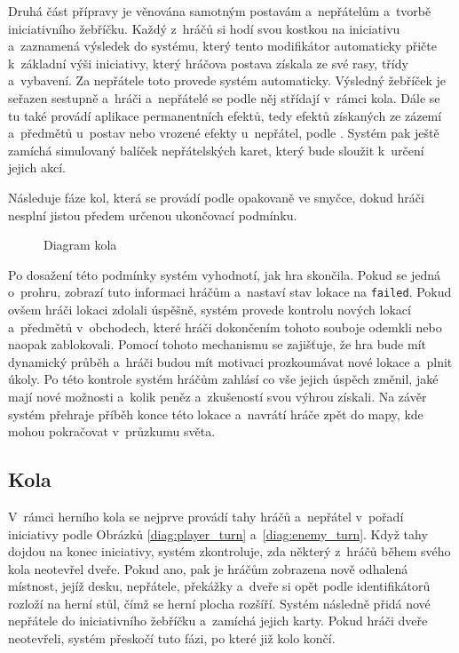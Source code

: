 Druhá část přípravy je věnována samotným postavám a~nepřátelům a~tvorbě iniciativního žebříčku. Každý z~hráčů si hodí svou kostkou na iniciativu a~zaznamená výsledek do systému, který tento modifikátor automaticky přičte k~základní výši iniciativy, který hráčova postava získala ze své rasy, třídy a~vybavení. Za nepřátele toto provede systém automaticky. Výsledný žebříček je seřazen sestupně a~hráči a~nepřátelé se podle něj střídají v~rámci kola. Dále se tu také provádí aplikace permanentních efektů, tedy efektů získaných ze zázemí a~předmětů u~postav nebo vrozené efekty u~nepřátel, podle . Systém pak ještě zamíchá simulovaný balíček nepřátelských karet, který bude sloužit k~určení jejich akcí.

Následuje fáze kol, která se provádí podle  opakovaně ve smyčce, dokud hráči nesplní jistou předem určenou ukončovací podmínku.

\begin{figure}[h]
    \centering
    \caption{Diagram kola}
    \label{diag:round}
\end{figure}

Po dosažení této podmínky systém vyhodnotí, jak hra skončila. Pokud se jedná o~prohru, zobrazí tuto informaci hráčům a~nastaví stav lokace na \texttt{failed}. Pokud ovšem hráči lokaci zdolali úspěšně, systém provede kontrolu nových lokací a~předmětů v~obchodech, které hráči dokončením tohoto souboje odemkli nebo naopak zablokovali. Pomocí tohoto mechanismu se zajišťuje, že hra bude mít dynamický průběh a~hráči budou mít motivaci prozkoumávat nové lokace a~plnit úkoly. Po této kontrole systém hráčům zahlásí co vše jejich úspěch změnil, jaké mají nové možnosti a~kolik peněz a~zkušeností svou výhrou získali. Na závěr systém přehraje příběh konce této lokace a~navrátí hráče zpět do mapy, kde mohou pokračovat v~průzkumu světa.


\subsection{Kola}
\label{subsec:design_rounds}

V~rámci herního kola  se nejprve provádí tahy hráčů a~nepřátel v~pořadí iniciativy podle Obrázků \ref{diag:player_turn} a~\ref{diag:enemy_turn}. Když tahy dojdou na konec iniciativy, systém zkontroluje, zda některý z~hráčů během svého kola neotevřel dveře. Pokud ano, pak je hráčům zobrazena nově odhalená místnost, jejíž desku, nepřátele, překážky a~dveře si opět podle identifikátorů rozloží na herní stůl, čímž se herní plocha rozšíří. Systém následně přidá nové nepřátele do iniciativního žebříčku a~zamíchá jejich karty. Pokud hráči dveře neotevřeli, systém přeskočí tuto fázi, po které již kolo končí.



